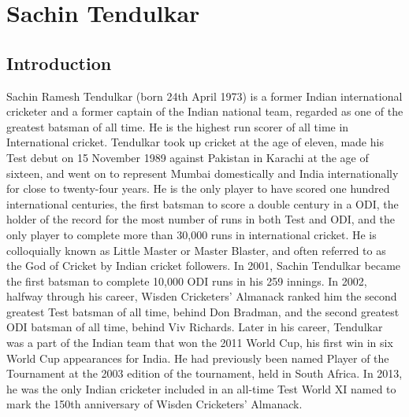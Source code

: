 \documentclass{report}
\begin{document}
	\chapter{Sachin Tendulkar}
	\section{Introduction}
Sachin Ramesh Tendulkar (born 24th April 1973) is a former Indian international cricketer and a former captain of the Indian national team, regarded as one of the greatest batsman of all time. He is the highest run scorer of all time in International cricket. Tendulkar took up cricket at the age of eleven, made his Test debut on 15 November 1989 against Pakistan in Karachi at the age of sixteen, and went on to represent Mumbai domestically and India internationally for close to twenty-four years. He is the only player to have scored one hundred international centuries, the first batsman to score a double century in a ODI, the holder of the record for the most number of runs in both Test and ODI, and the only player to complete more than 30,000 runs in international cricket. He is colloquially known as Little Master or Master Blaster, and often referred to as the God of Cricket by Indian cricket followers. In 2001, Sachin Tendulkar became the first batsman to complete 10,000 ODI runs in his 259 innings. In 2002, halfway through his career, Wisden Cricketers' Almanack ranked him the second greatest Test batsman of all time, behind Don Bradman, and the second greatest ODI batsman of all time, behind Viv Richards. Later in his career, Tendulkar was a part of the Indian team that won the 2011 World Cup, his first win in six World Cup appearances for India. He had previously been named Player of the Tournament at the 2003 edition of the tournament, held in South Africa. In 2013, he was the only Indian cricketer included in an all-time Test World XI named to mark the 150th anniversary of Wisden Cricketers' Almanack. 
\end{document}
